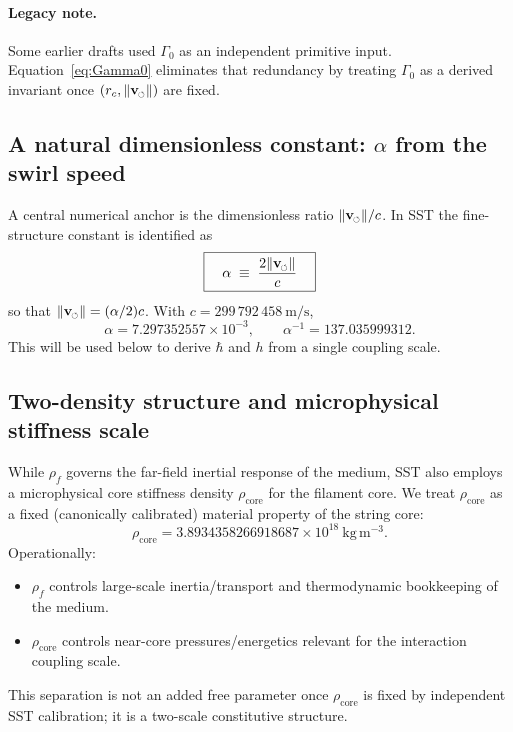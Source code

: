 \documentclass[pdflatex,sn-mathphys-num]{revtex4-2}
\newcommand{\swirlarrow}{\mathchoice{\mkern-2mu\scriptstyle\boldsymbol{\circlearrowleft}}{\mkern-2mu\scriptstyle\boldsymbol{\circlearrowleft}}{\mkern-2mu\scriptscriptstyle\boldsymbol{\circlearrowleft}}{\mkern-2mu\scriptscriptstyle\boldsymbol{\circlearrowleft}}}
\newcommand{\rhoF}{\rho_{\!f}}   %
\newcommand{\rhocore}{\rho_{\text{core}}}
\newcommand{\vswirl}{\mathbf{v}_{\swirlarrow}}
\newcommand{\vnorm}{\lVert \vswirl \rVert}
\providecommand{\rc}{r_c}
\newcommand{\clight}{c}
\begin{document}
        \paragraph{Legacy note.}
            Some earlier drafts used \(\Gamma_0\) as an independent primitive input. Equation~\eqref{eq:Gamma0}
            eliminates that redundancy by treating \(\Gamma_0\) as a derived invariant once \((\rc,\vnorm)\) are fixed.

    \subsection{A natural dimensionless constant: \(\alpha\) from the swirl speed}
    A central numerical anchor is the dimensionless ratio \(\vnorm/\clight\).
    In SST the fine-structure constant is identified as
    \begin{equation}
        \boxed{\quad \alpha \;\equiv\; \frac{2\vnorm}{\clight}\quad}
        \label{eq:alpha}
    \end{equation}
    so that \(\vnorm = (\alpha/2)\clight\). With \(\clight=299\,792\,458\ \mathrm{m/s}\),
    \begin{equation}
        \alpha = 7.297352557\times 10^{-3},\qquad \alpha^{-1}=137.035999312.
        \label{eq:alphanum}
    \end{equation}
    This will be used below to derive \(\hbar\) and \(h\) from a single coupling scale.

    \subsection{Two-density structure and microphysical stiffness scale}
    While \(\rhoF\) governs the far-field inertial response of the medium, SST also employs a microphysical
    core stiffness density \(\rhocore\) for the filament core.
    We treat \(\rhocore\) as a fixed (canonically calibrated) material property of the string core:
    \begin{equation}
        \rhocore = 3.8934358266918687\times 10^{18}\ \mathrm{kg\,m^{-3}}.
        \label{eq:rhocore}
    \end{equation}
    Operationally:
    \begin{itemize}
        \item \(\rhoF\) controls large-scale inertia/transport and thermodynamic bookkeeping of the medium.
        \item \(\rhocore\) controls near-core pressures/energetics relevant for the interaction coupling scale.
    \end{itemize}
    This separation is not an added free parameter once \(\rhocore\) is fixed by independent SST calibration; it is a
    two-scale constitutive structure.
\end{document}
